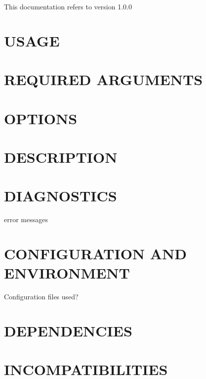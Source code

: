 \documentclass{book}
\begin{document}
This documentation refers to version 1.0.0


\section{USAGE}
\label{_USAGE}
\hypertarget{_USAGE}{}


\section{REQUIRED ARGUMENTS}
\label{_REQUIRED_ARGUMENTS}
\hypertarget{_REQUIRED_ARGUMENTS}{}


\section{OPTIONS}
\label{_OPTIONS}
\hypertarget{_OPTIONS}{}


\section{DESCRIPTION}
\label{_DESCRIPTION}
\hypertarget{_DESCRIPTION}{}


\section{DIAGNOSTICS}
\label{_DIAGNOSTICS}
\hypertarget{_DIAGNOSTICS}{}



error messages


\section{CONFIGURATION AND ENVIRONMENT}
\label{_CONFIGURATION_AND_ENVIRONMENT}
\hypertarget{_CONFIGURATION_AND_ENVIRONMENT}{}



Configuration files used?


\section{DEPENDENCIES}
\label{_DEPENDENCIES}
\hypertarget{_DEPENDENCIES}{}


\section{INCOMPATIBILITIES}
\label{_INCOMPATIBILITIES}
\hypertarget{_INCOMPATIBILITIES}{}
\end{document}
